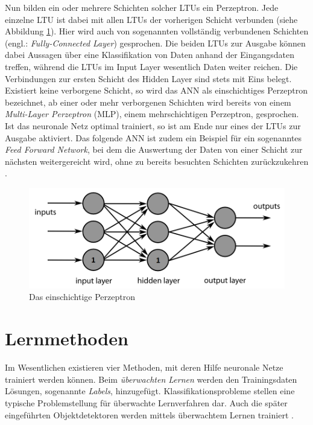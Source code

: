 Nun bilden ein oder mehrere Schichten solcher LTUs ein Perzeptron. Jede einzelne LTU ist dabei mit allen LTUs der vorherigen Schicht verbunden (siehe Abbildung \ref{neural_network}). Hier wird auch von sogenannten vollständig verbundenen Schichten (engl.: \textit{Fully-Connected Layer}) gesprochen. Die beiden LTUs zur Ausgabe können dabei Aussagen über eine Klassifikation von Daten anhand der Eingangsdaten treffen, während die LTUs im Input Layer wesentlich Daten weiter reichen. Die Verbindungen zur ersten Schicht des Hidden Layer sind stets mit Eins belegt. Existiert keine verborgene Schicht, so wird das ANN als einschichtiges Perzeptron bezeichnet, ab einer oder mehr verborgenen Schichten wird bereits von einem \textit{Multi-Layer Perzeptron} (MLP), einem mehrschichtigen Perzeptron, gesprochen. Ist das neuronale Netz optimal trainiert, so ist am Ende nur eines der LTUs zur Ausgabe aktiviert. Das folgende ANN ist zudem ein Beispiel für ein sogenanntes \textit{Feed Forward Network}, bei dem die Auswertung der Daten von einer Schicht zur nächsten weitergereicht wird, ohne zu bereits besuchten Schichten zurückzukehren \cite{AurelienGeron.2018}.

\begin{figure}[H]
	\begin{center}
		\includegraphics[width=12cm]{Bilder/neural_network.png} 
		\caption[Das einschichtige Perzeptron]{Das einschichtige Perzeptron \cite{Wikipedia.20190123}}
		\label{neural_network}
	\end{center}
\end{figure}

\section*{Lernmethoden}

Im Wesentlichen existieren vier Methoden, mit deren Hilfe neuronale Netze trainiert werden können. Beim \textit{überwachten Lernen} werden den Trainingsdaten Lösungen, sogenannte \textit{Labels}, hinzugefügt. Klassifikationsprobleme stellen eine typische Problemstellung für überwachte Lernverfahren dar. Auch die später eingeführten Objektdetektoren werden mittels überwachtem Lernen trainiert \cite{AurelienGeron.2018}. 

